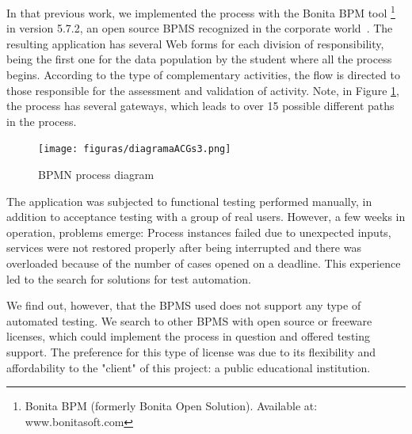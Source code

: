 \documentclass[runningheads,a4paper]{llncs}
\begin{document}
In that previous work, we implemented the process with the Bonita BPM tool \footnote{Bonita BPM (formerly Bonita Open Solution). Available at: www.bonitasoft.com} in version 5.7.2, an open source BPMS recognized in the corporate world~\cite{forrester}. The resulting application has several Web forms for each division of responsibility, being the first one for the data population by the student where all the process begins. According to the type of complementary activities, the flow is directed to those responsible for the assessment and validation of activity. Note, in Figure \ref{fig:diagrama}, the process has several gateways, which leads to over 15 possible different paths in the process.



\begin{figure}[ht]
\centering
\texttt{[image: figuras/diagramaACGs3.png]}
\caption{BPMN process diagram}
\label{fig:diagrama}
\end{figure}

The application was subjected to functional testing performed manually, in addition to acceptance testing with a group of real users. However, a few weeks in operation, problems emerge: Process instances failed due to unexpected inputs, services were not restored properly after being interrupted and there was overloaded because of the number of cases opened on a deadline. This experience led to the search for solutions for test automation.

We find out, however, that the BPMS used does not support any type of automated testing. We search to other BPMS with open source or freeware licenses, which could implement the process in question and offered testing support. The preference for this type of license was due to its flexibility and affordability to the "client" of this project: a public educational institution.
\end{document}
